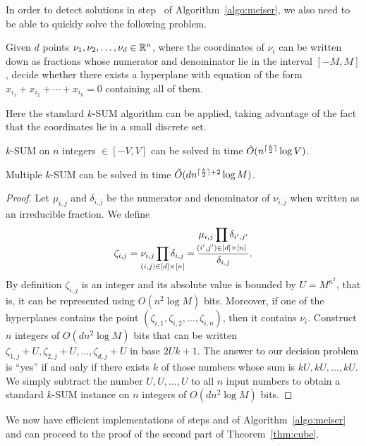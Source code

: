 In order to detect solutions in step~ of Algorithm~\ref{algo:meiser}, we also
need to be able to quickly solve the following problem.
\begin{problem}
	Given $d$ points $\nu_1,\nu_2,\ldots,\nu_d \in \mathbb{R}^n$, where the coordinates of
	$\nu_i$ can be written down as fractions whose numerator and denominator
	lie in the interval $[-M,M]$,
	decide whether there exists a hyperplane with equation of the form $x_{i_1}
	+ x_{i_2} + \cdots + x_{i_k} = 0$ containing all of them.
\end{problem}

Here the standard $k$-SUM algorithm can be applied, taking advantage of
the fact that the coordinates lie in a small discrete set.
\begin{lemma}\label{lem:ksum}
	$k$-SUM on $n$ integers $\in [-V,V]$ can be solved in time
	$\tilde{O}(n^{{\lceil\frac{k}{2} \rceil}}\log V)$.
\end{lemma}

\begin{lemma}\label{lem:multiple}
	Multiple $k$-SUM can be solved in time $\tilde{O}(dn^{{\lceil\frac{k}{2} \rceil}+2}\log M)$.
\end{lemma}
\begin{proof}
	Let $\mu_{i,j}$ and $\delta_{i,j}$ be the numerator and denominator of
	$\nu_{i,j}$ when written as an irreducible fraction. We define
	$$
		\zeta_{i,j} = \nu_{i,j}\prod_{\mathclap{(i,j) \in [d]\times[n]}} \delta_{i,j} =
		\frac{\mu_{i,j}\displaystyle\prod_{\mathclap{(i',j') \in [d]\times[n]}} \delta_{i',j'}}{\delta_{i,j}}.
	$$
	By definition $\zeta_{i,j}$ is an integer and its absolute value is bounded
	by $U = M^{n^2}$, that is, it can be
	represented using $O(n^2 \log M)$ bits. Moreover, if one of the hyperplanes
	contains the point $(\zeta_{i,1},\zeta_{i,2},\ldots,\zeta_{i,n})$, then it
	contains $\nu_i$. Construct $n$ integers of $O(dn^2 \log M)$ bits that can
	be written $\zeta_{1,j}+U,\zeta_{2,j}+U,\ldots,\zeta_{d,j}+U$ in base
	$2Uk+1$. The answer to our decision problem is ``yes'' if and only if there
	exists $k$ of those numbers whose sum is $kU,kU,\ldots,kU$. We simply
	subtract the number $U,U,\ldots,U$ to all $n$
	input numbers to obtain a standard $k$-SUM instance on $n$ integers of
	$O(dn^2 \log M)$ bits.
\end{proof}

We now have efficient implementations of steps  and 
of Algorithm~\ref{algo:meiser} and can proceed to the proof of the second part
of Theorem~\ref{thm:cube}.

